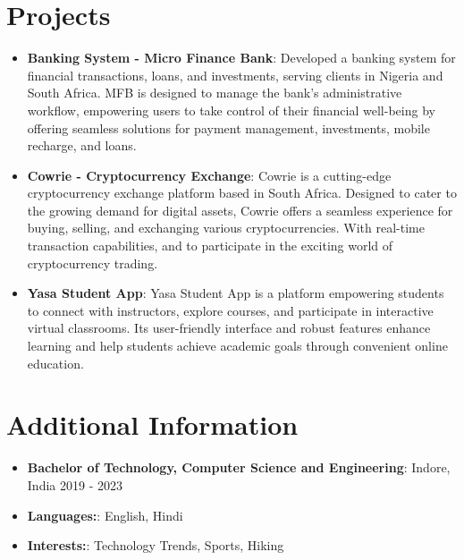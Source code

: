 \documentclass[a4paper,11pt]{article}
\newcommand{\resumeItem}[2]{\item \textbf{#1}: #2}
\newcommand{\resumeProject}[2]{\item \textbf{#1}: #2}
\begin{document}
\section{Projects}
\begin{itemize}[leftmargin=10pt]
    \resumeProject{Banking System - Micro Finance Bank}
    {Developed a banking system for financial transactions, loans, and investments, serving clients in Nigeria and South Africa. MFB is designed to manage the bank's administrative workflow, empowering users to take control of their financial well-being by offering seamless solutions for payment management, investments, mobile recharge, and loans.}

    \resumeProject{Cowrie - Cryptocurrency Exchange}
    {Cowrie is a cutting-edge cryptocurrency exchange platform based in South Africa. Designed to cater to the growing demand for digital assets, Cowrie offers a seamless experience for buying, selling, and exchanging various cryptocurrencies. With real-time transaction capabilities, and to participate in the exciting world of cryptocurrency trading.}

    \resumeProject{Yasa Student App}
    {Yasa Student App is a platform empowering students to connect with instructors, explore courses, and participate in interactive virtual classrooms. Its user-friendly interface and robust features enhance learning and help students achieve academic goals through convenient online education.}
\end{itemize}

\section{Additional Information}
\begin{itemize}[leftmargin=10pt]
    \resumeItem{Bachelor of Technology, Computer Science and Engineering}{Indore, India} {2019 - 2023}
    \resumeItem{Languages:}  English, Hindi
    \resumeItem{Interests:} Technology Trends,  Sports, Hiking
\end{itemize}
\end{document}
